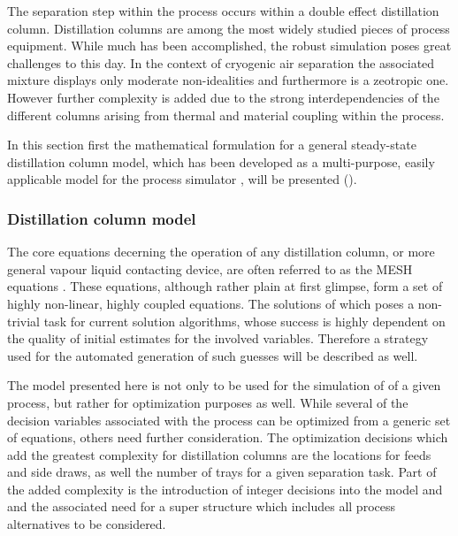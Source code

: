     The separation step within the process occurs within a double effect distillation column.
    Distillation columns are among the most widely studied pieces of process equipment. While much has been
    accomplished, the robust simulation poses great challenges to this day. In the context of cryogenic
    air separation the associated mixture displays only moderate non-idealities and furthermore is
    a zeotropic one. However further complexity is added due to the strong interdependencies of the different
    columns arising from thermal and material coupling within the process.

    In this section first the mathematical formulation for a general steady-state distillation column model,
    which has been developed as a multi-purpose, easily applicable model for the process simulator \gproms,
    will be presented ().

    \subsubsection{Distillation column model}
    \label{sec:mathpro:steady:distmodel}

        The core equations decerning the operation of any distillation column, or more general vapour liquid contacting
        device, are often referred to as the MESH equations . These equations, although
        rather plain at first glimpse, form a set of highly non-linear, highly coupled equations. The solutions of which
        poses a non-trivial task for current solution algorithms, whose success is highly dependent on the quality of
        initial estimates for the involved variables. Therefore a strategy used for the automated generation of such
        guesses will be described as well.

        The model presented here is not only to be used for the simulation of of a given process, but rather
        for optimization purposes as well. While several of the decision variables associated
        with the  process can be optimized from a generic set of equations, others need further consideration.
        The optimization decisions which add the greatest complexity for distillation columns are the locations for feeds
        and side draws, as well the number of trays for a given separation task. Part of the added complexity is
        the introduction of integer decisions into the model and and the associated need for a super structure which
        includes all process alternatives to be considered.

